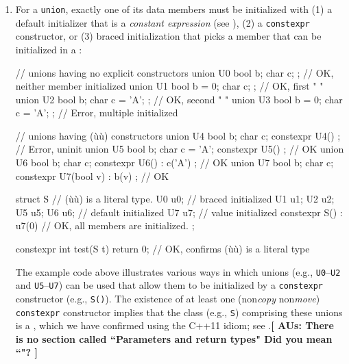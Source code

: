 \begin{enumerate}
{\begin{emcppslisting}
static_assert( S3().d_i  == 0, "");  // OK, value initialization
static_assert( S3{}.d_i  == 0, "");  // OK, braced initialization
static_assert( S3{7}.d_i == 7, "");  // Error, non(ù{}ù) constructor
\end{emcppslisting}
}


\item{For a \lstinline!union!, exactly one of its data members must be initialized with (1) a default initializer that is a \emph{constant expression} (see ), (2) a \lstinline!constexpr! constructor, or (3) braced initialization that picks a member that can be initialized in a :

\begin{emcppslisting}
// unions having no explicit constructors
union U0 { bool b;      char c;       };  // OK, neither member initialized
union U1 { bool b = 0;  char c;       };  // OK, first      "       "
union U2 { bool b;      char c = 'A'; };  // OK, second     "       "
union U3 { bool b = 0;  char c = 'A'; };  // Error, multiple initialized

// unions having (ù{}ù) constructors
union U4 { bool b; char c;        constexpr U4() { } };  // Error, uninit
union U5 { bool b; char c = 'A';  constexpr U5() { } };               // OK
union U6 { bool b; char c;        constexpr U6() : c('A') { } };      // OK
union U7 { bool b; char c;        constexpr U7(bool v) : b(v) { } };  // OK

struct S                         // (ù{}ù) is a literal type.
{
    U0 u0{};                     // braced  initialized
    U1 u1; U2 u2; U5 u5; U6 u6;  // default initialized
    U7 u7;                       // value   initialized
    constexpr S() : u7(0) { }    // OK, all members are initialized.
};

constexpr int test(S t) { return 0; }  // OK, confirms (ù{}ù) is a literal type
\end{emcppslisting}


\noindent The example code above illustrates various ways in which unions (e.g.,
\lstinline!U0!--\lstinline!U2! and \lstinline!U5!--\lstinline!U7!) can be used that
allow them to be initialized by a \lstinline!constexpr! constructor (e.g.,
\lstinline!S()!). The existence of at least one (non\emph{copy}
non\emph{move}) \lstinline!constexpr! constructor implies that the class
(e.g., \lstinline!S!) comprising these unions is a ,
which we have confirmed using the C++11  idiom;
see .\textbf{[ AUs: There is no section called ``Parameters and return types" Did you mean ``"? ] }
}


\end{enumerate}
